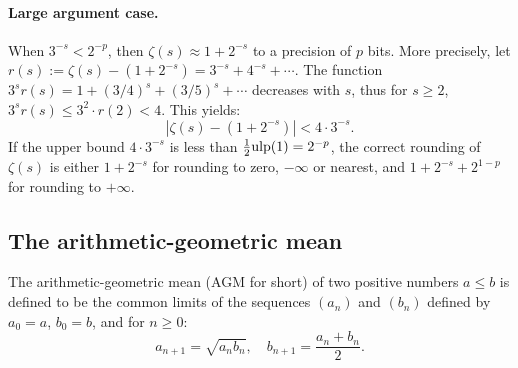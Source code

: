\documentclass[12pt]{amsart}
\def\ulp{{\rm ulp}}
\begin{document}
\paragraph{Large argument case.} When $3^{-s} < 2^{-p}$, then $\zeta(s)
\approx 1 + 2^{-s}$ to a precision of $p$ bits. More precisely, let
$r(s) := \zeta(s) - (1 + 2^{-s}) = 3^{-s} + 4^{-s} + \cdots$.
The function $3^s r(s) = 1 + (3/4)^s + (3/5)^s + \cdots$ decreases with $s$,
thus for $s \geq 2$, $3^s r(s) \leq 3^2 \cdot r(2) < 4$. This yields:
\[ |\zeta(s) - (1 + 2^{-s})| < 4 \cdot 3^{-s}. \]
If the upper bound $4 \cdot 3^{-s}$ is less than $\frac{1}{2} \ulp(1)
= 2^{-p}$, the correct rounding of $\zeta(s)$ is either $1 + 2^{-s}$ for
rounding to zero, $-\infty$ or nearest,
and $1 + 2^{-s} + 2^{1-p}$ for rounding to $+\infty$.

\subsection{The arithmetic-geometric mean}

The arithmetic-geometric mean (AGM for short) of two positive numbers
$a \leq b$ is defined to be the common limits of the sequences
$(a_n)$ and $(b_n)$ defined by $a_0 = a$, $b_0 = b$, and for $n \geq 0$:
\[ a_{n+1} = \sqrt{a_n b_n}, \quad b_{n+1} = \frac{a_n + b_n}{2}. \]
\end{document}
